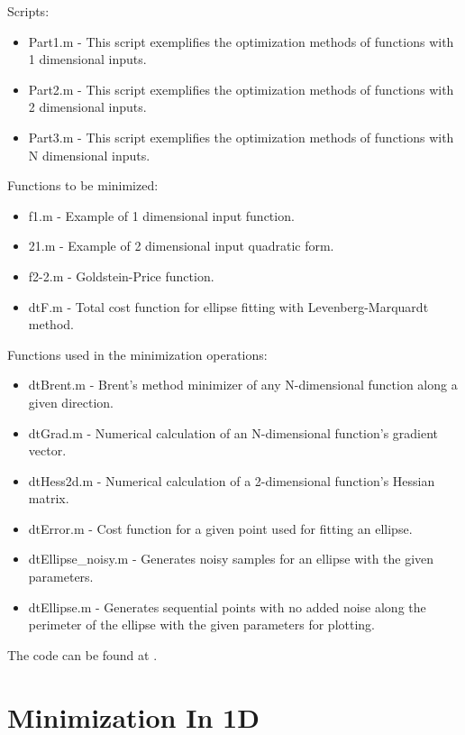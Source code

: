 \documentclass[journal]{IEEEtran}
\begin{document}
Scripts:
\begin{itemize}
    \item Part1.m - This script exemplifies the optimization methods of functions with 1 dimensional inputs.
    \item Part2.m - This script exemplifies the optimization methods of functions with 2 dimensional inputs.
    \item Part3.m - This script exemplifies the optimization methods of functions with N dimensional inputs.
\end{itemize}

Functions to be minimized:
\begin{itemize}
    \item f1.m - Example of 1 dimensional input function.
    \item 21.m - Example of 2 dimensional input quadratic form.
    \item f2-2.m - Goldstein-Price function.
    \item dtF.m - Total cost function for ellipse fitting with Levenberg-Marquardt method.
\end{itemize}

Functions used in the minimization operations:
\begin{itemize}
    \item dtBrent.m - Brent's method minimizer of any N-dimensional function along a given direction.
    \item dtGrad.m - Numerical calculation of an N-dimensional function's gradient vector.
    \item dtHess2d.m - Numerical calculation of a 2-dimensional function's Hessian matrix.
    \item dtError.m - Cost function for a given point used for fitting an ellipse.
    \item dtEllipse\_noisy.m - Generates noisy samples for an ellipse with the given parameters.
    \item dtEllipse.m - Generates sequential points with no added noise along the perimeter of the ellipse with the given parameters for plotting.
\end{itemize}

The code can be found at \cite{github}.

\section{Minimization In 1D} \label{1d}
\end{document}
